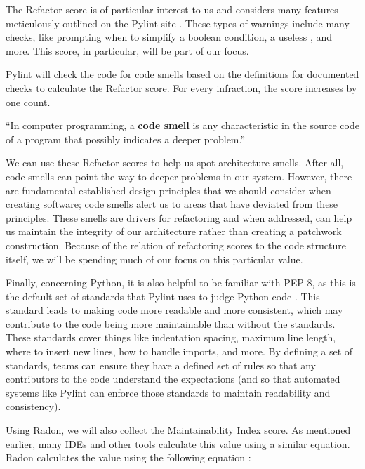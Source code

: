 The Refactor score is of particular interest to us and considers many features meticulously outlined on the Pylint site \cite{pylint:refactor}. These types of warnings include many checks, like prompting when to simplify a boolean condition, a useless , and more. This score, in particular, will be part of our focus.

Pylint will check the code for code smells based on the definitions for documented checks to calculate the Refactor score. For every infraction, the score increases by one count. 


\vspace{0.25cm}
\begin{displayquote}
  ``In computer programming, a \textbf{code smell} is any characteristic in the source code of a program that possibly indicates a deeper problem.'' \cite{wiki:code-smells}
\end{displayquote}
\vspace{0.25cm}

We can use these Refactor scores to help us spot architecture smells. After all, code smells can point the way to deeper problems in our system. However, there are fundamental established design principles that we should consider when creating software; code smells alert us to areas that have deviated from these principles. These smells are drivers for refactoring and when addressed, can help us maintain the integrity of our architecture rather than creating a patchwork construction. Because of the relation of refactoring scores to the code structure itself, we will be spending much of our focus on this particular value.

Finally, concerning Python, it is also helpful to be familiar with PEP 8, as this is the default set of standards that Pylint uses to judge Python code \cite{pylint:pep8}. This standard leads to making code more readable and more consistent, which may contribute to the code being more maintainable than without the standards. These standards cover things like indentation spacing, maximum line length, where to insert new lines, how to handle imports, and more. By defining a set of standards, teams can ensure they have a defined set of rules so that any contributors to the code understand the expectations (and so that automated systems like Pylint can enforce those standards to maintain readability and consistency).

Using Radon, we will also collect the Maintainability Index score. As mentioned earlier, many IDEs and other tools calculate this value using a similar equation. Radon calculates the value using the following equation \cite{radon:docs}:

